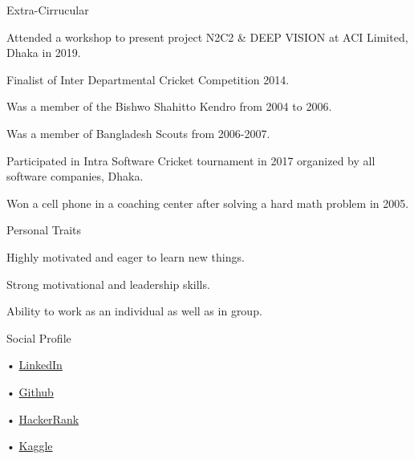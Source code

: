 \documentclass{resume} %
\begin{document}

\begin{rSection}{Extra-Cirrucular} \itemsep -3pt
\item Attended a workshop to present project N2C2 \& DEEP VISION at ACI Limited, Dhaka in 2019.
\item Finalist of Inter Departmental Cricket Competition 2014.
\item Was a member of the Bishwo Shahitto Kendro from 2004 to 2006.
\item Was a member of Bangladesh Scouts from 2006-2007.
\item  Participated in Intra Software Cricket tournament in 2017 organized by all software companies, Dhaka.
\item Won a cell phone in a coaching center after solving a hard math problem in 2005.


\end{rSection}

\begin{rSection}{Personal Traits}
\item Highly motivated and eager to learn new things.
\item Strong motivational and leadership skills.
\item Ability to work as an individual as well as in group.
\end{rSection}

\begin{rSection}{Social Profile}
\item[•] \href{https://www.linkedin.com/in/md-abdul-hasib-sazzad-19b88099/}{LinkedIn}
\item[•] \href{https://github.com/sazzadBuet08/}{Github}
\item[•] \href{https://www.hackerrank.com/SazzadBuet08}{HackerRank}
\item[•] \href{https://www.kaggle.com/sazzadabdulhasib}{Kaggle}
\end{rSection}
\end{document}

